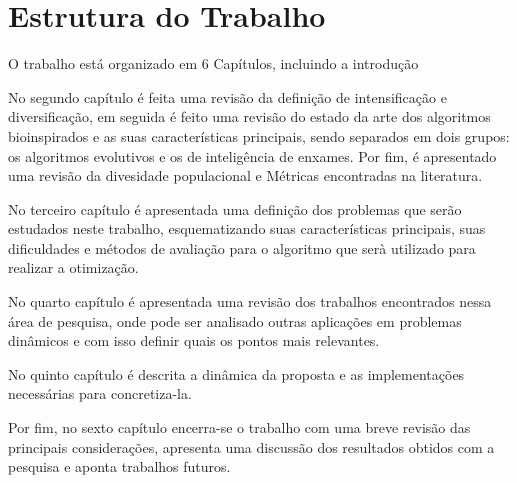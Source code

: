 \section{Estrutura do Trabalho}
\label{sec:escopo}

O trabalho está organizado em 6 Capítulos, incluindo a introdução

No segundo capítulo é feita uma revisão da definição de intensificação e diversificação, em seguida é feito uma revisão do estado da arte dos algoritmos bioinspirados e as suas características principais, sendo separados em dois grupos: os algoritmos evolutivos e os de inteligência de enxames. Por fim, é apresentado uma revisão da divesidade populacional e Métricas encontradas na literatura.

No terceiro capítulo é apresentada uma definição dos problemas que serão estudados neste trabalho, esquematizando suas características principais, suas dificuldades e métodos de avaliação para o algoritmo que serà utilizado para realizar a otimização.

No quarto capítulo é apresentada uma revisão dos trabalhos encontrados nessa área de pesquisa, onde pode ser analisado outras aplicações em problemas dinâmicos e com isso definir quais os pontos mais relevantes.

No quinto capítulo é descrita a dinâmica da proposta e as implementações necessárias para concretiza-la.

Por fim, no sexto capítulo encerra-se o trabalho com uma breve revisão das principais considerações, apresenta uma discussão dos resultados obtidos com a pesquisa e aponta trabalhos futuros.